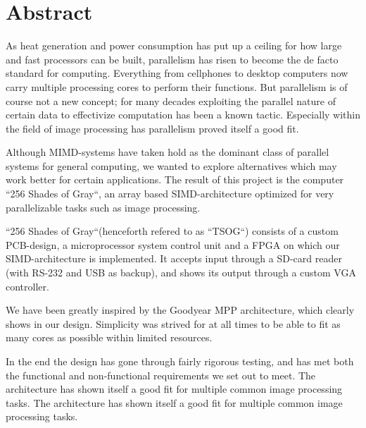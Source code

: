 \begingroup
\let\clearpage\relax
\let\cleardoublepage\relax
\let\cleardoublepage\relax

\chapter*{Abstract}
 As heat generation and
power consumption has put up a ceiling for how large and fast processors can be
built, parallelism has risen to become the de facto standard for computing.
Everything from cellphones to desktop computers now carry multiple processing
cores to perform their functions. But parallelism is of course not a new
concept; for many decades exploiting the parallel nature of certain data to
effectivize computation has been a known tactic. Especially within the field of
image processing has parallelism proved itself a good fit.

Although MIMD-systems have taken hold as the dominant class of parallel systems
for general computing, we wanted to explore alternatives which may work better
for certain applications. The result of this project is the computer ``256
Shades of Gray``, an array based SIMD-architecture optimized for very
parallelizable tasks such as image processing.

``256 Shades of Gray``(henceforth refered to as ``TSOG``) consists of
a custom PCB-design, a microprocessor system control unit and a FPGA on which
our SIMD-architecture is implemented. It accepts input through a SD-card reader
(with RS-232 and USB as backup), and shows its output through a custom VGA
controller.

We have been greatly inspired by the Goodyear MPP architecture, which clearly
shows in our design. Simplicity was strived for at all times to be able to fit
as many cores as possible within limited resources.

In the end the design has gone through fairly rigorous testing, and has met both
the functional and non-functional requirements we set out to meet. The
architecture has shown itself a good fit for multiple common image processing
tasks. The architecture has shown itself a good fit for multiple common image
processing tasks.
\endgroup
